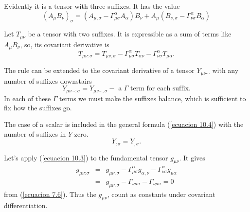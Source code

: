Evidently it is a tensor with three suffixes. It has the value
\[
  \left(A_{\mu} B_{\nu} \right)_{\sigma} =
  \left(A_{\mu,\sigma} - \Gamma^{\alpha}_{\mu\sigma} A_{\alpha}\right)B_{\nu} 
+ A_{\mu} \left(B_{\nu,\sigma} - \Gamma^{\alpha}_{\nu\sigma}B_{\alpha}\right)
\]

Let $T_{\mu\nu}$ be a tensor with two suffixes. It is expressible as a sum of 
terms like $A_{\mu}B_{\nu}$, so, its covariant derivative is
\begin{equation}
 \label{ecuacion 10.3}
 T_{\mu\nu:\sigma} = T_{\mu\nu,\sigma}
 - \Gamma^{\alpha}_{\mu\sigma} T_{\alpha\nu}
 - \Gamma^{\alpha}_{\nu\sigma} T_{\mu\alpha}.
\end{equation}


The rule can be extended to the covariant derivative of a tensor 
$Y_{\mu\nu\cdots}$ with any number of suffixes downstairs
\begin{equation}
 \label{ecuacion 10.4}
 Y_{\mu\nu\cdots:\sigma} = Y_{\mu\nu\cdots,\sigma} - \mbox{ a }
 \Gamma \mbox{ term for each suffix}.
\end{equation}
In each of these $\Gamma$ terms we must make the suffixes balance, which is 
sufficient to fix how the suffixes go.

The case of a scalar is included in the general formula (\ref{ecuacion 10.4}) 
with the number of suffixes in $Y$ zero.
\begin{equation}
 \label{ecuacion 10.5}
 Y_{:\sigma} = Y_{,\sigma} .
\end{equation}

Let's apply (\ref{ecuacion 10.3}) to the fundamental tensor $g_{\mu\nu}$. It 
gives
\[
\begin{array}{rcl}
    g_{\mu\nu:\sigma} & = & g_{\mu\nu,\sigma} 
   - \Gamma^{\alpha}_{\mu\sigma} g_{\alpha,\nu}
   - \Gamma^{\alpha}_{\nu\sigma} g_{\mu\alpha} \\
   & = & g_{\mu\nu,\sigma} - \Gamma_{\nu\mu\sigma} - \Gamma_{\nu\mu\sigma} = 0
\end{array}
\]
from (\ref{ecuacion 7.6}). Thus the $g_{\mu\nu}$, count as constants under 
covariant differentiation.

